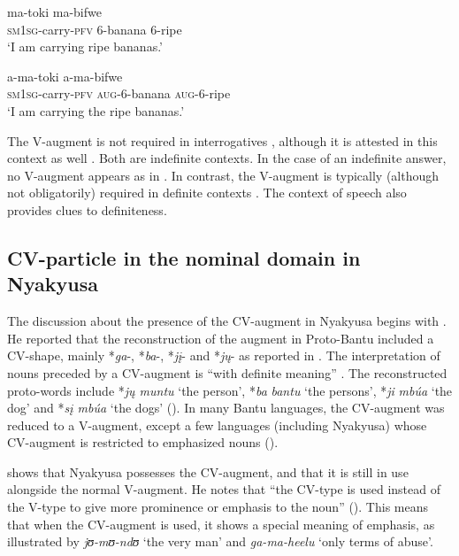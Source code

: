 \documentclass[output=paper]{langscibook}
\begin{document}
  \ex\label{ex:lusekelo:20c}        {ma-toki}     {ma-bifwe}\\
    \textsc{sm1sg-}carry-\textsc{pfv}     6-banana    6-ripe\\
  \glt  ‘I am carrying ripe bananas.’

  \ex\label{ex:lusekelo:20d}        {a-ma-toki}     {a-ma-bifwe}\\
    \textsc{sm1sg-}carry-\textsc{pfv}     \textsc{aug-}6-banana    \textsc{aug-}6-ripe \\
  \glt  ‘I am carrying the ripe bananas.’ 
    \z
\z

The V-aug\-ment is not required in interrogatives , although it is attested in this context as well . Both are indefinite contexts. In the case of an indefinite answer, no V-aug\-ment appears as in . In contrast, the V-aug\-ment is typically (although not obligatorily) required in definite contexts . The context of speech also provides clues to definiteness.  

\subsection{CV-particle in the nominal domain in Nyakyusa}\label{sec:lusekelo:2.3}

The discussion about the presence of the CV-aug\-ment in Nyakyusa begins with \citet[93]{DeBlois1970}. He reported that the reconstruction of the augment in Proto-Bantu included a CV-shape, mainly *\textit{ga}{}-, *\textit{ba}{}-, *\textit{j\k{i}}{}- and *\textit{j\k{u}}{}- as reported in \citet{Meeussen1967}. The interpretation of nouns preceded by a CV-aug\-ment is “with definite meaning” \citep[99]{Meeussen1967}. The reconstructed proto-words include *\textit{j\k{u} muntu} ‘the person’, *\textit{ba} \textit{bantu} ‘the persons’, *\textit{ji} \textit{mbúa} ‘the dog’ and *\textit{s\k{i} mbúa} ‘the dogs’ (\citeyear[99]{Meeussen1967}). In many Bantu languages, the CV-aug\-ment was reduced to a V-aug\-ment, except a few languages (including Nyakyusa) whose CV-aug\-ment is restricted to emphasized nouns (\citealt[92--93]{DeBlois1970}).    

 shows that Nyakyusa possesses the CV-aug\-ment, and that it is still in use alongside the normal V-aug\-ment. He notes that “the CV-type is used instead of the V-type to give more prominence or emphasis to the noun” (\citealt[98]{DeBlois1970}). This means that when the CV-aug\-ment is used, it shows a special meaning of emphasis, as illustrated by \textit{jʊ{}-mʊ{}-ndʊ} ‘the very man’ and {\textit{g}}\textit{a-ma-heelu} ‘only terms of abuse’.
\end{document}
